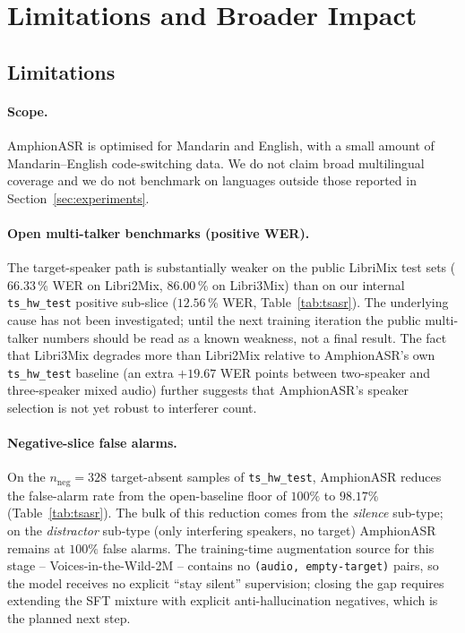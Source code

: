 \section{Limitations and Broader Impact}
\label{sec:limitations}

\subsection{Limitations}

\paragraph{Scope.}
AmphionASR is optimised for Mandarin and English, with a small
amount of Mandarin--English code-switching data. We do not claim
broad multilingual coverage and we do not benchmark on languages
outside those reported in Section~\ref{sec:experiments}.

\paragraph{Open multi-talker benchmarks (positive WER).}
The target-speaker path is substantially weaker on the public
LibriMix test sets ($66.33$\,\% WER on Libri2Mix, $86.00$\,\% on
Libri3Mix) than on our internal \texttt{ts\_hw\_test} positive
sub-slice ($12.56$\,\% WER, Table~\ref{tab:tsasr}). The underlying
cause has not been investigated; until the next training
iteration the public multi-talker numbers should be read as a
known weakness, not a final result. The fact that Libri3Mix
degrades more than Libri2Mix relative to AmphionASR's own
\texttt{ts\_hw\_test} baseline (an extra $+19.67$ WER points
between two-speaker and three-speaker mixed audio) further
suggests that AmphionASR's speaker selection is not yet robust to
interferer count.

\paragraph{Negative-slice false alarms.}
On the $n_\text{neg} = 328$ target-absent samples of
\texttt{ts\_hw\_test}, AmphionASR reduces the false-alarm rate
from the open-baseline floor of $100\%$ to $98.17\%$
(Table~\ref{tab:tsasr}). The bulk of this reduction comes from
the \emph{silence} sub-type; on the \emph{distractor} sub-type
(only interfering speakers, no target) AmphionASR remains at
$100\%$ false alarms. The training-time augmentation source for
this stage -- Voices-in-the-Wild-2M -- contains no
\texttt{(audio, empty-target)} pairs, so the model receives no
explicit ``stay silent'' supervision; closing the gap requires
extending the SFT mixture with explicit anti-hallucination
negatives, which is the planned next step.

